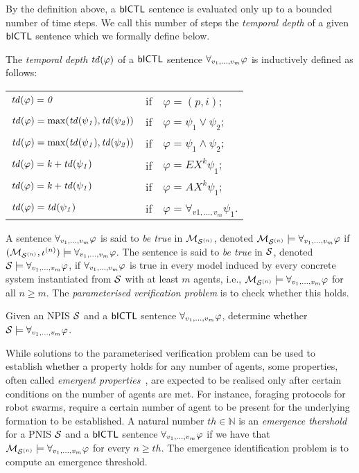 By the definition above, a $\sf{bICTL}$ sentence is evaluated only up to a bounded
number of time steps.  We call this number of steps the {\em temporal depth} of
a given $\sf{bICTL}$ sentence which we formally define below.

\begin{definition}%
  The \emph{temporal depth} $\it{td}(\varphi)$ of a $\sf{bICTL}$ sentence $\forall_{v_1,\ldots,v_m} \varphi$ is
  inductively defined as follows:
\begin{center}
\begin{tabular}{lll}
  $\it{td}(\varphi) = 0$ & if & $\varphi = (p, i)$; \\
  $\it{td}(\varphi) = \max(\it{td}(\psi_1), \it{td}(\psi_2))$  & if & $\varphi = \psi_1 \lor \psi_2$; \\
  $\it{td}(\varphi) = \max(\it{td}(\psi_1), \it{td}(\psi_2))$  & if & $\varphi = \psi_1 \land \psi_2$; \\
  $\it{td}(\varphi) =  k + \it{td}(\psi_1)$  & if & $\varphi = EX^k \psi_1$; \\
  $\it{td}(\varphi) =  k + \it{td}(\psi_1)$  & if & $\varphi = AX^k \psi_1$; \\
  $\it{td}(\varphi) = \it{td}(\psi_1)$  & if & $\varphi = \forall_{v1,\ldots,v_m} \psi_1$.
\end{tabular}
\end{center}
\end{definition}

A sentence $\forall_{v_1,\ldots,v_m} \varphi$ is said to \emph{be true} in $\mathcal{M}_{\mathcal{S}^{(n)}}$, denoted
$\mathcal{M}_{\mathcal{S}^{(n)}} \models \forall_{v_1,\ldots,v_m} \varphi$ if $(\mathcal{M}_{\mathcal{S}^{(n)}}, \iota^{({n})}) \models
\forall_{v_1,\ldots,v_m} \varphi$. The sentence is said to \emph{be true} in $\mathcal{S}$, denoted
$\mathcal{S} \models \forall_{v_1,\ldots,v_m} \varphi$, if $\forall_{v_1,\ldots,v_m} \varphi$ is true in every model induced by
every concrete system instantiated from $\mathcal{S}$ with at least $m$ agents, i.e.,
$\mathcal{M}_{\mathcal{S}^{(n)}} \models \forall_{v_1,\ldots,v_m} \varphi$ for all $n \geq m$.  The {\em parameterised
  verification problem} is to check whether this holds.


\begin{definition}
  Given an NPIS $\mathcal{S}$ and a $\sf{bICTL}$ sentence $\forall_{v_1,\ldots,v_m} \varphi$, determine whether
  $\mathcal{S} \models \forall_{v_1,\ldots,v_m} \varphi$.
\end{definition}

While solutions to the parameterised verification problem can be used to
establish whether a property holds for any number of agents, some properties,
often called \emph{emergent properties}~\cite{KouvarosLomuscio15b}, are
expected to be realised only after certain conditions on the number of agents
are met. For instance, foraging protocols for robot swarms, require a certain
number of agent to be present for the underlying formation to be established. A
natural number $\mathit{th} \in \mathbb N$ is an {\em emergence thershold} for
a PNIS $\mathcal{S}$ and a $\sf{bICTL}$ sentence $\forall_{v_1,\ldots,v_m} \varphi$ if we have that
$\mathcal{M}_{\mathcal{S}^{(n)}} \models \forall_{v_1,\ldots,v_m} \varphi$ for every $n \geq \mathit{th}$. The emergence
identification problem is to compute an emergence threshold.


